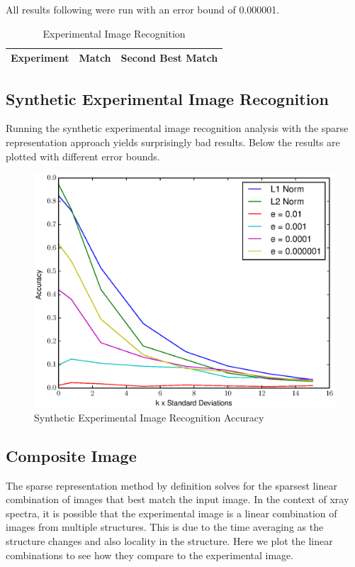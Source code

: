 \documentclass[12pt,letterpaper]{article}
\begin{document}
All results following were run with an error bound of 0.000001.

\begin{table}[h]
  \begin{center}
  \begin{tabular}{|l|l|l|}
    \hline
    \textbf{Experiment} & \textbf{Match} & \textbf{Second Best Match} \\ \hline
    
  \end{tabular}
  \caption{Experimental Image Recognition}
  \end{center}
\end{table}


\clearpage

\subsection{Synthetic Experimental Image Recognition}
Running the synthetic experimental image recognition analysis with the sparse
representation approach yields surprisingly bad results. Below the results are
plotted with different error bounds.
\begin{figure}[ht]
  \begin{center}
    \includegraphics[scale=0.8]{figs/SparseRepAccuracyVsLpNorms.eps}
    \caption{Synthetic Experimental Image Recognition Accuracy}
  \end{center}
\end{figure}
\clearpage

\subsection{Composite Image}
The sparse representation method by definition solves for the sparsest linear
combination of images that best match the input image. In the context of xray
spectra, it is possible that the experimental image is a linear combination of
images from multiple structures. This is due to the time averaging as the
structure changes and also locality in the structure. Here we plot the linear
combinations to see how they compare to the experimental image.

\clearpage
\end{document}
